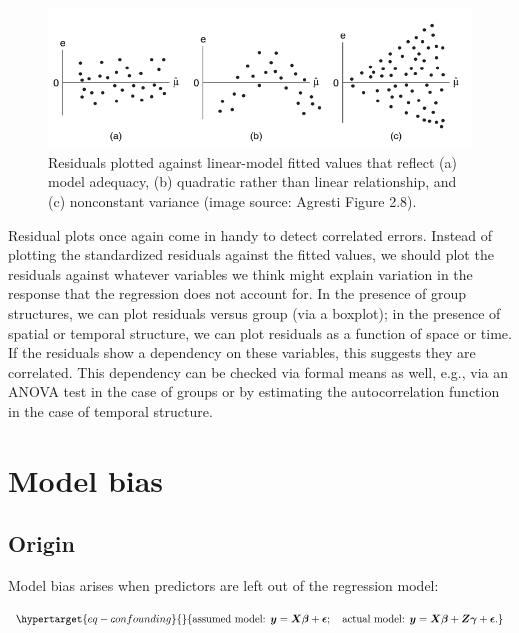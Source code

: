\documentclass[
  11pt,
  letterpaper,
  oneside]{book}
\theoremstyle{definition}
\theoremstyle{plain}
\theoremstyle{plain}
\theoremstyle{plain}
\theoremstyle{remark}
\begin{document}
\begin{figure}

{\centering \includegraphics[width=1\textwidth,height=\textheight]{figures/residual-plots.png}

}

\caption{\label{fig-residual-plots}Residuals plotted against
linear-model fitted values that reflect (a) model adequacy, (b)
quadratic rather than linear relationship, and (c) nonconstant variance
(image source: Agresti Figure 2.8).}

\end{figure}

Residual plots once again come in handy to detect correlated errors.
Instead of plotting the standardized residuals against the fitted
values, we should plot the residuals against whatever variables we think
might explain variation in the response that the regression does not
account for. In the presence of group structures, we can plot residuals
versus group (via a boxplot); in the presence of spatial or temporal
structure, we can plot residuals as a function of space or time. If the
residuals show a dependency on these variables, this suggests they are
correlated. This dependency can be checked via formal means as well,
e.g., via an ANOVA test in the case of groups or by estimating the
autocorrelation function in the case of temporal structure.

\hypertarget{sec-model-bias}{%
\section{Model bias}\label{sec-model-bias}}

\hypertarget{origin-2}{%
\subsection{Origin}\label{origin-2}}

Model bias arises when predictors are left out of the regression model:

\begin{equation}\protect\hypertarget{eq-confounding}{}{
\text{assumed model: } \boldsymbol{y} = \boldsymbol{X} \boldsymbol{\beta} + \boldsymbol{\epsilon}; \quad \text{actual model: } \boldsymbol{y} = \boldsymbol{X} \boldsymbol{\beta} + \boldsymbol{Z} \boldsymbol{\gamma} + \boldsymbol{\epsilon}.
}\label{eq-confounding}\end{equation}
\end{document}
